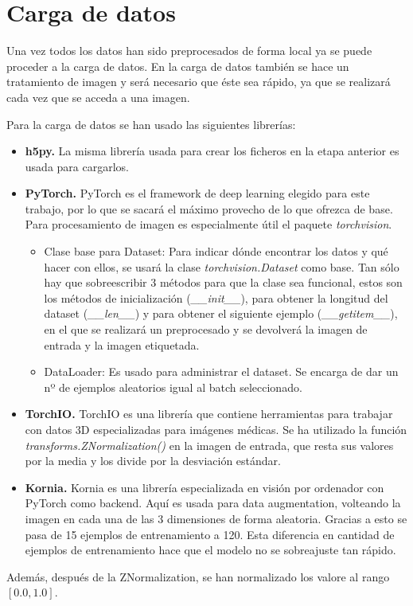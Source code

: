 \section{Carga de datos}\label{sec:data_loading_processing}

Una vez todos los datos han sido preprocesados de forma local ya se puede proceder a la carga de datos. En la carga de datos también se hace un tratamiento de imagen y será necesario que éste sea rápido, ya que se realizará cada vez que se acceda a una imagen.

Para la carga de datos se han usado las siguientes librerías:
\begin{itemize}
\item \textbf{h5py.} La misma librería usada para crear los ficheros en la etapa anterior es usada para cargarlos.
\item \textbf{PyTorch.} PyTorch es el framework de deep learning elegido para este trabajo, por lo que se sacará el máximo provecho de lo que ofrezca de base. Para procesamiento de imagen es especialmente útil el paquete \textit{torchvision}.
\begin{itemize}
\item Clase base para Dataset: Para indicar dónde encontrar los datos y qué hacer con ellos, se usará la clase \textit{torchvision.Dataset} como base. Tan sólo hay que sobreescribir 3 métodos para que la clase sea funcional, estos son los métodos de inicialización (\textit{\_\_init\_\_}), para obtener la longitud del dataset (\textit{\_\_len\_\_}) y para obtener el siguiente ejemplo (\textit{\_\_getitem\_\_}), en el que se realizará un preprocesado y se devolverá la imagen de entrada y la imagen etiquetada.
\item DataLoader: Es usado para administrar el dataset. Se encarga de dar un nº de ejemplos aleatorios igual al batch seleccionado.
\end{itemize}

\item \textbf{TorchIO.} TorchIO \cite{PerezGarcia2020} es una librería que contiene herramientas para trabajar con datos 3D especializadas para imágenes médicas. Se ha utilizado la función \textit{transforms.ZNormalization()} en la imagen de entrada, que resta sus valores por la media y los divide por la desviación estándar.
\item \textbf{Kornia.} Kornia \cite{ERiba2020} es una librería especializada en visión por ordenador con PyTorch como backend. Aquí es usada para data augmentation, volteando la imagen en cada una de las 3 dimensiones de forma aleatoria. Gracias a esto se pasa de 15 ejemplos de entrenamiento a 120. Esta diferencia en cantidad de ejemplos de entrenamiento hace que el modelo no se sobreajuste tan rápido.

\end{itemize}
Además, después de la ZNormalization, se han normalizado los valore al rango $[0.0, 1.0]$.  

